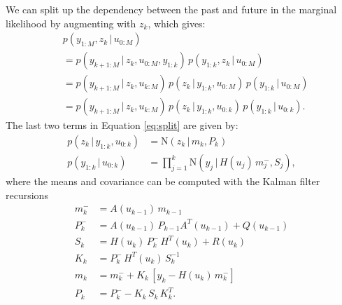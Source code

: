 \documentclass[twocolumn]{autart}    %
\begin{document}
We can split up the dependency between the past and future in the
marginal likelihood by augmenting with $z_k$, which gives:
%
\begin{equation}
\begin{split}
  &p(y_{1:M},z_k\,|\,u_{0:M}) \\
  &= 
    p(y_{k+1:M}\,|\,z_k,u_{0:M},y_{1:k}) \,
    p(y_{1:k},z_k \,|\, u_{0:M}) \\
  &= 
    p(y_{k+1:M}\,|\,z_k,u_{k:M}) \,
    p(z_k \,|\, y_{1:k},u_{0:M}) \,
    p(y_{1:k} \,|\, u_{0:M}) \\
  &= 
    p(y_{k+1:M}\,|\,z_k,u_{k:M}) \,
    p(z_k \,|\, y_{1:k},u_{0:k}) \,
    p(y_{1:k} \,|\, u_{0:k}).
\end{split}
\label{eq:split}
\end{equation}
%
The last two terms in Equation \eqref{eq:split} are given by:
%
\begin{equation}
\begin{split}
  p(z_k \,|\,y_{1:k},u_{0:k})
  &= \mathrm{N}(z_k\,|\,m_k,P_k) \\
  p(y_{1:k}\,|\,u_{0:k})
  &= \prod_{j=1}^k \mathrm{N}(y_j\,|\,H(u_j) \, m^-_j,S_j),
\end{split}
\end{equation}
%
where the means and covariance can be computed
with the Kalman filter recursions
%
\begin{equation}
\begin{split}
 m^-_k &= A(u_{k-1}) \, m_{k-1} \\
 P^-_k &= A(u_{k-1}) \, P_{k-1} A^T(u_{k-1}) + Q(u_{k-1}) \\
   S_k &= H(u_{k}) \, P^-_k \, H^T(u_{k}) + R(u_{k}) \\
   K_k &= P^-_k \, H^T(u_{k}) \, S_k^{-1} \\
   m_k &= m^-_k + K_k \, [y_k - H(u_{k}) \, m^-_k] \\
   P_k &= P^-_k - K_k \, S_k \, K_k^T.
\end{split}
\end{equation}
\end{document}
